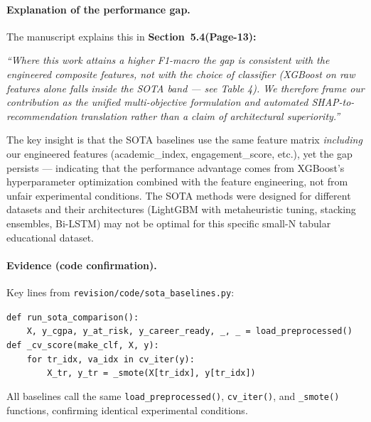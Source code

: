 \documentclass[11pt,a4paper]{article}
\newcommand{\filebox}[1]{\texttt{\small #1}}
\newcommand{\sectref}[1]{Section~#1}
\newcommand{\stress}[1]{\textbf{#1}}
\begin{document}
\paragraph{Explanation of the performance gap.} The manuscript  explains this in \stress{\sectref{5.4}(Page-13):}

\begin{evidencebox}
\noindent \textit{``Where this work attains a higher F1-macro the gap is consistent with the engineered composite features, not with the choice of classifier (XGBoost on raw features alone falls inside the SOTA band --- see Table 4). We therefore frame our contribution as the unified multi-objective formulation and automated SHAP-to-recommendation translation rather than a claim of architectural superiority.''}
\end{evidencebox}

The key insight is that the SOTA baselines use the same feature matrix \emph{including} our engineered features (academic\_index, engagement\_score, etc.), yet the gap persists --- indicating that the performance advantage comes from XGBoost's hyperparameter optimization combined with the feature engineering, not from unfair experimental conditions. The SOTA methods were designed for different datasets and their architectures (LightGBM with metaheuristic tuning, stacking ensembles, Bi-LSTM) may not be optimal for this specific small-N tabular educational dataset.

\paragraph{Evidence (code confirmation).} Key lines from \filebox{revision/code/sota\_baselines.py}:

\begin{evidencebox}
\noindent \texttt{def run\_sota\_comparison():} \\
\texttt{\ \ \ \ X, y\_cgpa, y\_at\_risk, y\_career\_ready, \_, \_ = load\_preprocessed()} \\[3pt]
\noindent \texttt{def \_cv\_score(make\_clf, X, y):} \\
\texttt{\ \ \ \ for tr\_idx, va\_idx in cv\_iter(y):} \\
\texttt{\ \ \ \ \ \ \ \ X\_tr, y\_tr = \_smote(X[tr\_idx], y[tr\_idx])}
\end{evidencebox}

All baselines call the same \texttt{load\_preprocessed()}, \texttt{cv\_iter()}, and \texttt{\_smote()} functions, confirming identical experimental conditions.
\end{document}
